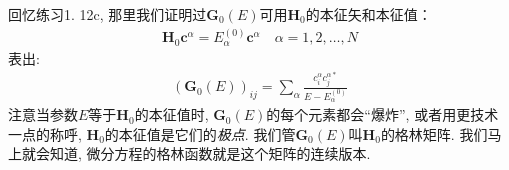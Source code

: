 回忆练习1.
12c, 
那里我们证明过$\mathbf{G}_0(E)$可用$\mathbf{H}_0$的本征矢和本征值：
\begin{align}
\mathbf{H}_0\mathbf{c}^\alpha = E_\alpha^{(0)} \mathbf{c}^\alpha \quad \alpha = 1,2,\ldots,N 
\end{align}
表出:
\begin{align}
(\mathbf{G}_0(E))_{ij} = \sum_\alpha \frac{c_i^\alpha c_j^{\alpha*}}{E - E_{\alpha}^{(0)}}
\end{align}
注意当参数$E$等于$\mathbf{H}_0$的本征值时, 
$\mathbf{G}_0(E)$的每个元素都会“爆炸”, 
或者用更技术一点的称呼, 
$\mathbf{H}_0$的本征值是它们的\emph{极点}. 
我们管$\mathbf{G}_0(E)$叫$\mathbf{H}_0$的格林矩阵. 
我们马上就会知道, 
微分方程的格林函数就是这个矩阵的连续版本.


